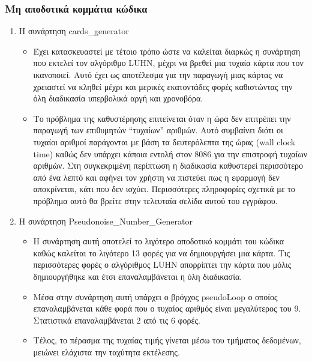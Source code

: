 \documentclass[10pt,a4paper]{article}
\begin{document}
\subsubsection*{Μη αποδοτικά κομμάτια κώδικα}
\begin{enumerate}
\item Η συνάρτηση \latintext cards\_generator \greektext
	\begin{itemize}
	\item Έχει κατασκευαστεί με τέτοιο τρόπο ώστε να καλείται διαρκώς η συνάρτηση που εκτελεί τον αλγόριθμο \latintext LUHN\greektext, μέχρι να βρεθεί μια τυχαία κάρτα που τον ικανοποιεί. Αυτό έχει ως αποτέλεσμα για την παραγωγή μιας κάρτας να χρειαστεί να κληθεί μέχρι και μερικές εκατοντάδες φορές καθιστώντας την όλη διαδικασία υπερβολικά αργή και χρονοβόρα.
	\item Το πρόβλημα της καθυστέρησης επιτείνεται όταν η ώρα δεν επιτρέπει την παραγωγή των επιθυμητών “τυχαίων” αριθμών. Αυτό συμβαίνει διότι οι τυχαίοι αριθμοί παράγονται με βάση τα δευτερόλεπτα της ώρας \latintext (wall clock time) \greektext καθώς δεν υπάρχει κάποια εντολή στον 8086 για την επιστροφή τυχαίων αριθμών. Στη συγκεκριμένη περίπτωση η διαδικασία καθυστερεί περισσότερο από ένα λεπτό και αφήνει τον χρήστη να πιστεύει πως η εφαρμογή δεν αποκρίνεται, κάτι που δεν ισχύει. Περισσότερες πληροφορίες σχετικά με το πρόβλημα αυτό θα βρείτε στην τελευταία σελίδα αυτού του εγγράφου.
	\end{itemize}
\item Η συνάρτηση \latintext Pseudonoise\_Number\_Generator \greektext
	\begin{itemize}
	\item Η συνάρτηση αυτή αποτελεί το λιγότερο αποδοτικό κομμάτι του κώδικα καθώς καλείται το λιγότερο 13 φορές για να δημιουργήσει μια κάρτα. Τις περισσότερες φορές ο αλγόριθμος \latintext LUHN \greektext απορρίπτει την κάρτα που μόλις δημιουργήθηκε και έτσι επαναλαμβάνεται η όλη διαδικασία. 
	\item Μέσα στην συνάρτηση αυτή υπάρχει ο βρόγχος \latintext pseudoLoop \greektext ο οποίος επαναλαμβάνεται κάθε φορά που ο τυχαίος αριθμός είναι μεγαλύτερος του 9. Στατιστικά επαναλαμβάνεται 2 από τις 6 φορές.
	\item Τέλος, το πέρασμα της τυχαίας τιμής γίνεται μέσω του τμήματος δεδομένων, μειώνει ελάχιστα την ταχύτητα εκτέλεσης.
	\end{itemize}
\end{enumerate}
\end{document}
